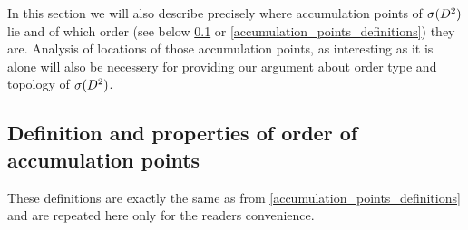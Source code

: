 In this section we will also describe precisely where accumulation points of ${{\sigma}(D^2)}$ lie and of 
 which order 
(see below \ref{accumulation_points_definitions repetition} or 
\ref{accumulation_points_definitions}) they are. Analysis of locations of those 
accumulation points, as interesting as it is alone will also be necessery for providing 
our argument about order type and topology of ${{\sigma}(D^2)}$. 
\subsection{Definition and properties of order of accumulation points}
\label{accumulation_points_definitions repetition} 
These definitions are exactly the same as from \ref{accumulation_points_definitions} and 
are repeated here only for the readers convenience.


